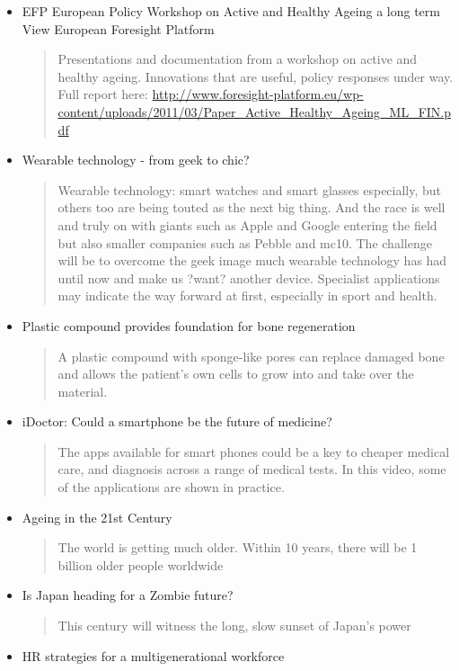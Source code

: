 \begin{itemize}
\item EFP European Policy Workshop on Active and Healthy Ageing a long term View \textregistered European Foresight Platform
\begin{quotation}
Presentations and documentation from a workshop on active and healthy ageing.  Innovations that are useful, policy responses under way. Full report here: \url{http://www.foresight-platform.eu/wp-content/uploads/2011/03/Paper\_Active\_Healthy\_Ageing\_ML\_FIN.pdf}\end{quotation}
\item Wearable technology - from geek to chic?
\begin{quotation}
Wearable technology: smart watches and smart glasses especially, but others too are being touted as the next big thing. And the race is well and truly on with giants such as Apple and Google entering the field but also smaller companies such as Pebble and mc10. The challenge will be to overcome the geek image much wearable technology has had until now and make us ?want? another device. Specialist applications may indicate the way forward at first, especially in sport and health.\end{quotation}
\item Plastic compound provides foundation for bone regeneration
\begin{quotation}
A plastic compound with sponge-like pores can replace damaged bone and allows the patient's own cells to grow into and take over the material.\end{quotation}
\item iDoctor: Could a smartphone be the future of medicine?
\begin{quotation}
The apps available for smart phones could be a key to cheaper medical care, and diagnosis across a range of medical tests. In this video, some of the applications are shown in practice.\end{quotation}
\item Ageing in the 21st Century
\begin{quotation}
The world is getting much older. Within 10 years, there will be 1 billion older people worldwide\end{quotation}
\item Is Japan heading for a Zombie future?
\begin{quotation}
This century will witness the long, slow sunset of Japan's power\end{quotation}
\item HR strategies for a multigenerational workforce

\end{itemize}
